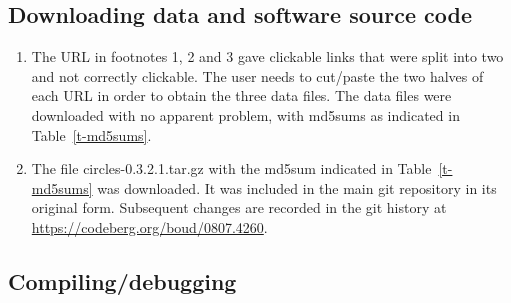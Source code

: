 \subsection{Downloading data and software source code}

\begin{enumerate}
\item
  The URL in footnotes 1, 2 and 3\supercite{RBG08} gave clickable
  links that were split into two and not correctly clickable. The user
  needs to cut/paste the two halves of each URL in order to obtain the
  three data files. The data files were downloaded with no apparent
  problem, with md5sums as indicated in Table~\ref{t-md5sums}.
\item
  The file {\sc circles-0.3.2.1.tar.gz} with the md5sum indicated in
  Table~\ref{t-md5sums} was downloaded. It was included in
  the main git repository in its original form. Subsequent changes
  are recorded in the git history at
  \url{https://codeberg.org/boud/0807.4260}.
\end{enumerate}

\subsection{Compiling/debugging}

